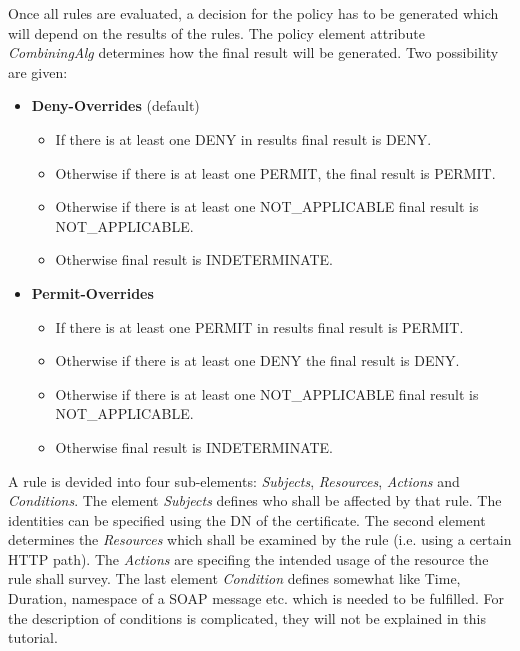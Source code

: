 Once all rules are evaluated, a decision for the policy has to be generated which will depend on the results of the rules.
The policy element attribute \textit{CombiningAlg} determines how the final result will be generated. Two possibility are given:
\begin{itemize}
 \item \textbf{Deny-Overrides} (default) 
 \begin{itemize}
	\item If there is at least one DENY in results final result is DENY. 
	\item Otherwise if there is at least one PERMIT, the final result is PERMIT.
	\item Otherwise if there is at least one NOT\_APPLICABLE final result is NOT\_APPLICABLE.
	\item Otherwise final result is INDETERMINATE.
 \end{itemize}
  \item \textbf{Permit-Overrides}
 \begin{itemize}
 	\item If there is at least one PERMIT in results final result is PERMIT.
 	\item Otherwise if there is at least one DENY the final result is DENY.
 	\item Otherwise if there is at least one NOT\_APPLICABLE final result is NOT\_APPLICABLE.
 	\item Otherwise final result is INDETERMINATE.
 \end{itemize}
\end{itemize}
\forcelinebreak

A rule is devided into four sub-elements: \textit{Subjects}, \textit{Resources}, \textit{Actions} and \textit{Conditions}. 
The element \textit{Subjects} defines who shall be affected by that rule.
The identities can be specified using the DN of the certificate.
The second element determines the \textit{Resources} which shall be examined by the rule (i.e. using a certain HTTP path).
The \textit{Actions} are specifing the intended usage of the resource the rule shall survey.
The last element \textit{Condition} defines somewhat like Time, Duration, namespace of a SOAP message etc. which is needed to be fulfilled.
For the description of conditions is complicated, they will not be explained in this tutorial.\\


